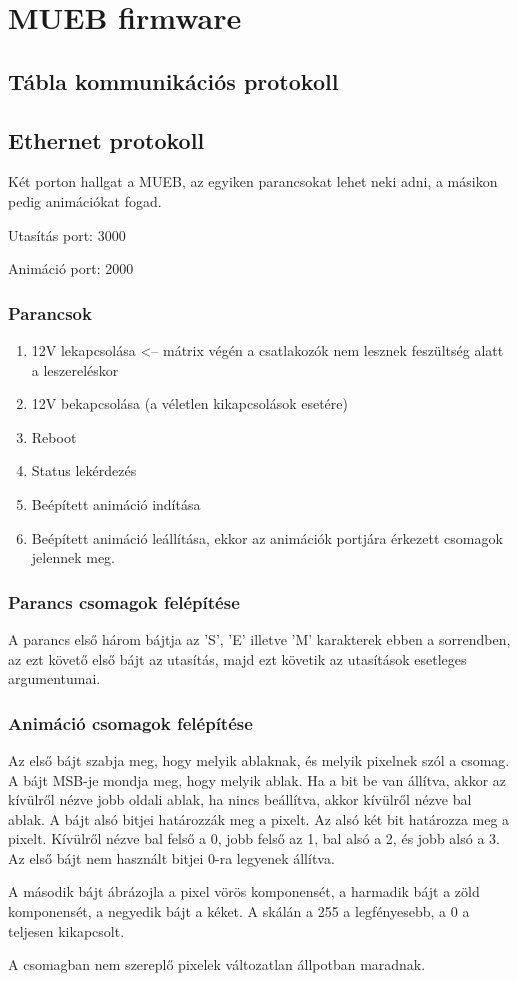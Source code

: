 \chapter{MUEB firmware}

\section{Tábla kommunikációs protokoll}
\section{Ethernet protokoll}
Két porton hallgat a MUEB, az egyiken parancsokat lehet neki adni, a másikon pedig animációkat fogad.
\par
Utasítás port: 3000
\par
Animáció port: 2000

\subsection{Parancsok}
\begin{enumerate}
  \item 12V lekapcsolása <-- mátrix végén a csatlakozók nem lesznek feszültség alatt a leszereléskor
  \item 12V bekapcsolása (a véletlen kikapcsolások esetére)
  \item Reboot
  \item Status lekérdezés
  \item Beépített animáció indítása
  \item Beépített animáció leállítása, ekkor az animációk portjára érkezett csomagok jelennek meg.
\end{enumerate}
\subsection{Parancs csomagok felépítése}
A parancs első három bájtja az 'S', 'E' illetve 'M' karakterek ebben a sorrendben, az ezt követő első bájt az utasítás, majd ezt követik az utasítások esetleges argumentumai. 
\subsection{Animáció csomagok felépítése}
Az első bájt szabja meg, hogy melyik ablaknak, és melyik pixelnek szól a csomag. A bájt MSB-je mondja meg, hogy melyik ablak. Ha a bit be van állítva, akkor az kívülről nézve jobb oldali ablak, ha nincs beállítva, akkor kívülről nézve bal ablak. A bájt alsó bitjei határozzák meg a pixelt. Az alsó két bit határozza meg a pixelt. Kívülről nézve bal felső a 0, jobb felső az 1, bal alsó a 2, és jobb alsó a 3. Az első bájt nem használt bitjei 0-ra legyenek állítva. 
\par
A második bájt ábrázojla a pixel vörös komponensét, a harmadik bájt a zöld komponensét, a negyedik bájt a kéket. A skálán a 255 a legfényesebb, a 0 a teljesen kikapcsolt.
\par
A csomagban nem szereplő pixelek változatlan állpotban maradnak.
